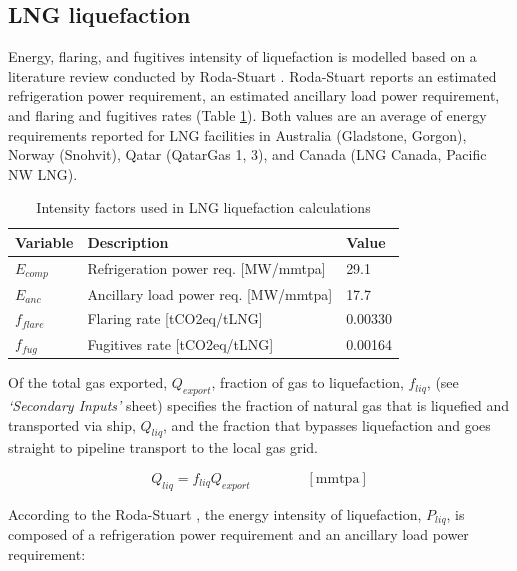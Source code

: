 \documentclass[11pt]{report}
\newcommand{\sheet}[1]{\textit{`{#1}'}}
\newcommand{\eqnunit}[1]{\quad\quad \scriptstyle{\left[\text{#1}\right]}}
\begin{document}
\subsection{LNG liquefaction}

Energy, flaring, and fugitives intensity of liquefaction is modelled based on a literature review conducted by Roda-Stuart \cite{RodaStuart2018}. Roda-Stuart reports an estimated refrigeration power requirement, an estimated ancillary load power requirement, and flaring and fugitives rates (Table \ref{tab:liquefaction}). Both values are an average of energy requirements reported for LNG facilities in Australia (Gladstone, Gorgon), Norway (Snohvit), Qatar (QatarGas 1, 3), and Canada (LNG Canada, Pacific NW LNG).

\begin{table}[h]
\begin{scriptsize}
\caption{Intensity factors used in LNG liquefaction calculations}
\label{tab:liquefaction}
\begin{tabular*}{0.8\columnwidth}{p{}p{}p{}}
\toprule
Variable & Description & Value \\
\midrule
$E_{comp}$ & Refrigeration power req. [MW/mmtpa] & 29.1 \\
$E_{anc}$ & Ancillary load power req. [MW/mmtpa] & 17.7 \\
$f_{flare}$ & Flaring rate [tCO2eq/tLNG] & 0.00330 \\
$f_{fug}$ & Fugitives rate [tCO2eq/tLNG] & 0.00164 \\
\bottomrule
\end{tabular*}
\end{scriptsize}
\end{table}

Of the total gas exported, $Q_{export}$, fraction of gas to liquefaction, $f_{liq}$, (see \sheet{Secondary Inputs} sheet) specifies the fraction of natural gas that is liquefied and transported via ship, $Q_{liq}$, and the fraction that bypasses liquefaction and goes straight to pipeline transport to the local gas grid. 

\begin{equation}
Q_{liq} = f_{liq} Q_{export} \quad\quad\eqnunit{mmtpa}
\end{equation}

According to the Roda-Stuart \cite{RodaStuart2018}, the energy intensity of liquefaction, $P_{liq}$, is composed of a refrigeration power requirement and an ancillary load power requirement:
\end{document}
